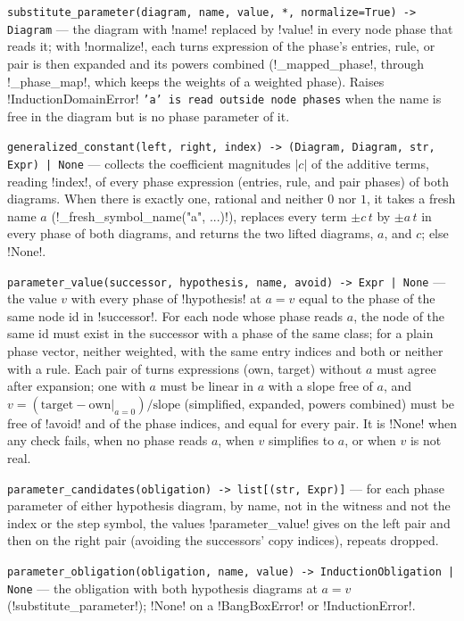 \begin{signature}
\texttt{substitute\_\allowbreak{}parameter(\allowbreak{}diagram,\allowbreak{} name,\allowbreak{} value,\allowbreak{} *,\allowbreak{} normalize=True) -> Diagram} --- the diagram with \code!name! replaced by \code!value! in every node phase that reads it; with \code!normalize!, each turns expression of the phase's entries, rule, or pair is then expanded and its powers combined (\py!_mapped_phase!, through \py!_phase_map!, which keeps the weights of a weighted phase). Raises \py!InductionDomainError! \texttt{'a' is read outside node phases} when the name is free in the diagram but is no phase parameter of it.

\texttt{generalized\_\allowbreak{}constant(\allowbreak{}left,\allowbreak{} right,\allowbreak{} index) -> (\allowbreak{}Diagram,\allowbreak{} Diagram,\allowbreak{} str,\allowbreak{} Expr) | None} --- collects the coefficient magnitudes $|c|$ of the additive terms, reading \code!index!, of every phase expression (entries, rule, and pair phases) of both diagrams. When there is exactly one, rational and neither $0$ nor $1$, it takes a fresh name $a$ (\py!_fresh_symbol_name("a", ...)!), replaces every term $\pm c\,t$ by $\pm a\,t$ in every phase of both diagrams, and returns the two lifted diagrams, $a$, and $c$; else \py!None!.

\texttt{parameter\_\allowbreak{}value(\allowbreak{}successor,\allowbreak{} hypothesis,\allowbreak{} name,\allowbreak{} avoid) -> Expr | None} --- the value $v$ with every phase of \code!hypothesis! at $a=v$ equal to the phase of the same node id in \code!successor!. For each node whose phase reads $a$, the node of the same id must exist in the successor with a phase of the same class; for a plain phase vector, neither weighted, with the same entry indices and both or neither with a rule. Each pair of turns expressions (own, target) without $a$ must agree after expansion; one with $a$ must be linear in $a$ with a slope free of $a$, and $v=(\text{target}-\text{own}|_{a=0})/\text{slope}$ (simplified, expanded, powers combined) must be free of \code!avoid! and of the phase indices, and equal for every pair. It is \py!None! when any check fails, when no phase reads $a$, when $v$ simplifies to $a$, or when $v$ is not real.

\texttt{parameter\_\allowbreak{}candidates(\allowbreak{}obligation) -> list[(\allowbreak{}str,\allowbreak{} Expr)]} --- for each phase parameter of either hypothesis diagram, by name, not in the witness and not the index or the step symbol, the values \py!parameter_value! gives on the left pair and then on the right pair (avoiding the successors' copy indices), repeats dropped.

\texttt{parameter\_\allowbreak{}obligation(\allowbreak{}obligation,\allowbreak{} name,\allowbreak{} value) -> InductionObligation | None} --- the obligation with both hypothesis diagrams at $a=v$ (\py!substitute_parameter!); \py!None! on a \py!BangBoxError! or \py!InductionError!.
\end{signature}

